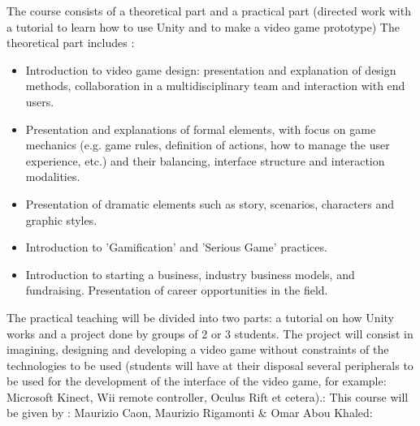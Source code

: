 The course consists of a theoretical part and a practical part (directed work with a tutorial to learn how to use Unity and to make a video game prototype) The theoretical part includes :
\begin{itemize}
    \item Introduction to video game design: presentation and explanation of design methods, collaboration in a multidisciplinary team and interaction with end users.
    \item Presentation and explanations of formal elements, with focus on game mechanics (e.g. game rules, definition of actions, how to manage the user experience, etc.) and their balancing, interface structure and interaction modalities.
    \item Presentation of dramatic elements such as story, scenarios, characters and graphic styles.
    \item Introduction to 'Gamification' and 'Serious Game' practices.
    \item Introduction to starting a business, industry business models, and fundraising. Presentation of career opportunities in the field.
\end{itemize}
The practical teaching will be divided into two parts: a tutorial on how Unity works and a project done by groups of 2 or 3 students. The project will consist in imagining, designing and developing a video game without constraints of the technologies to be used (students will have at their disposal several peripherals to be used for the development of the interface of the video game, for example: Microsoft Kinect, Wii remote controller, Oculus Rift et cetera).:
This course will be given by : Maurizio Caon, Maurizio Rigamonti \& Omar Abou Khaled: